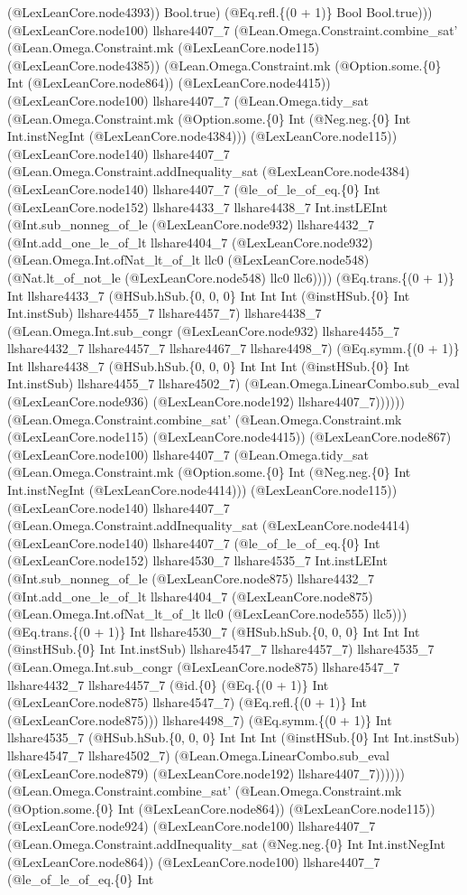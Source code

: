 \documentclass[11pt]{article}
\begin{document}
(@LexLeanCore.node4393)) Bool.true) (@Eq.refl.\{(0 + 1)\} Bool Bool.true))) (@LexLeanCore.node100) llshare4407\_7 (@Lean.Omega.Constraint.combine\_sat' (@Lean.Omega.Constraint.mk (@LexLeanCore.node115) (@LexLeanCore.node4385)) (@Lean.Omega.Constraint.mk (@Option.some.\{0\} Int (@LexLeanCore.node864)) (@LexLeanCore.node4415)) (@LexLeanCore.node100) llshare4407\_7 (@Lean.Omega.tidy\_sat (@Lean.Omega.Constraint.mk (@Option.some.\{0\} Int (@Neg.neg.\{0\} Int Int.instNegInt (@LexLeanCore.node4384))) (@LexLeanCore.node115)) (@LexLeanCore.node140) llshare4407\_7 (@Lean.Omega.Constraint.addInequality\_sat (@LexLeanCore.node4384) (@LexLeanCore.node140) llshare4407\_7 (@le\_of\_le\_of\_eq.\{0\} Int (@LexLeanCore.node152) llshare4433\_7 llshare4438\_7 Int.instLEInt (@Int.sub\_nonneg\_of\_le (@LexLeanCore.node932) llshare4432\_7 (@Int.add\_one\_le\_of\_lt llshare4404\_7 (@LexLeanCore.node932) (@Lean.Omega.Int.ofNat\_lt\_of\_lt llc0 (@LexLeanCore.node548) (@Nat.lt\_of\_not\_le (@LexLeanCore.node548) llc0 llc6)))) (@Eq.trans.\{(0 + 1)\} Int llshare4433\_7 (@HSub.hSub.\{0, 0, 0\} Int Int Int (@instHSub.\{0\} Int Int.instSub) llshare4455\_7 llshare4457\_7) llshare4438\_7 (@Lean.Omega.Int.sub\_congr (@LexLeanCore.node932) llshare4455\_7 llshare4432\_7 llshare4457\_7 llshare4467\_7 llshare4498\_7) (@Eq.symm.\{(0 + 1)\} Int llshare4438\_7 (@HSub.hSub.\{0, 0, 0\} Int Int Int (@instHSub.\{0\} Int Int.instSub) llshare4455\_7 llshare4502\_7) (@Lean.Omega.LinearCombo.sub\_eval (@LexLeanCore.node936) (@LexLeanCore.node192) llshare4407\_7)))))) (@Lean.Omega.Constraint.combine\_sat' (@Lean.Omega.Constraint.mk (@LexLeanCore.node115) (@LexLeanCore.node4415)) (@LexLeanCore.node867) (@LexLeanCore.node100) llshare4407\_7 (@Lean.Omega.tidy\_sat (@Lean.Omega.Constraint.mk (@Option.some.\{0\} Int (@Neg.neg.\{0\} Int Int.instNegInt (@LexLeanCore.node4414))) (@LexLeanCore.node115)) (@LexLeanCore.node140) llshare4407\_7 (@Lean.Omega.Constraint.addInequality\_sat (@LexLeanCore.node4414) (@LexLeanCore.node140) llshare4407\_7 (@le\_of\_le\_of\_eq.\{0\} Int (@LexLeanCore.node152) llshare4530\_7 llshare4535\_7 Int.instLEInt (@Int.sub\_nonneg\_of\_le (@LexLeanCore.node875) llshare4432\_7 (@Int.add\_one\_le\_of\_lt llshare4404\_7 (@LexLeanCore.node875) (@Lean.Omega.Int.ofNat\_lt\_of\_lt llc0 (@LexLeanCore.node555) llc5))) (@Eq.trans.\{(0 + 1)\} Int llshare4530\_7 (@HSub.hSub.\{0, 0, 0\} Int Int Int (@instHSub.\{0\} Int Int.instSub) llshare4547\_7 llshare4457\_7) llshare4535\_7 (@Lean.Omega.Int.sub\_congr (@LexLeanCore.node875) llshare4547\_7 llshare4432\_7 llshare4457\_7 (@id.\{0\} (@Eq.\{(0 + 1)\} Int (@LexLeanCore.node875) llshare4547\_7) (@Eq.refl.\{(0 + 1)\} Int (@LexLeanCore.node875))) llshare4498\_7) (@Eq.symm.\{(0 + 1)\} Int llshare4535\_7 (@HSub.hSub.\{0, 0, 0\} Int Int Int (@instHSub.\{0\} Int Int.instSub) llshare4547\_7 llshare4502\_7) (@Lean.Omega.LinearCombo.sub\_eval (@LexLeanCore.node879) (@LexLeanCore.node192) llshare4407\_7)))))) (@Lean.Omega.Constraint.combine\_sat' (@Lean.Omega.Constraint.mk (@Option.some.\{0\} Int (@LexLeanCore.node864)) (@LexLeanCore.node115)) (@LexLeanCore.node924) (@LexLeanCore.node100) llshare4407\_7 (@Lean.Omega.Constraint.addInequality\_sat (@Neg.neg.\{0\} Int Int.instNegInt (@LexLeanCore.node864)) (@LexLeanCore.node100) llshare4407\_7 (@le\_of\_le\_of\_eq.\{0\} Int 
\end{document}
